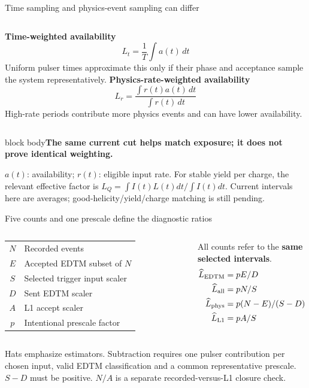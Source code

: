 \documentclass[aspectratio=169,11pt]{beamer}
\newcommand{\source}[1]{\par\vfill{\scriptsize\color{muted}#1\par}}
\newcommand{\takeaway}[1]{\begin{beamercolorbox}[sep=2.5mm,wd=\linewidth]{block body}\textbf{#1}\end{beamercolorbox}}
\newcommand{\Lp}{\widehat L_{\rm EDTM}}
\newcommand{\Lphys}{\widehat L_{\rm phys}}
\newcommand{\Lall}{\widehat L_{\rm all}}
\newcommand{\LLone}{\widehat L_{\rm L1}}
\begin{document}
\begin{frame}{Time sampling and physics-event sampling can differ}
\begin{columns}[T]
\textbf{Time-weighted availability}
\[L_{t}=\frac{1}{T}\int a(t)\,dt\]
Uniform pulser times approximate this only if their phase and acceptance sample the system representatively.
\textbf{Physics-rate-weighted availability}
\[L_r=\frac{\int r(t)a(t)\,dt}{\int r(t)\,dt}\]
High-rate periods contribute more physics events and can have lower availability.
\end{columns}
\vspace{4mm}
\takeaway{The same current cut helps match exposure; it does not prove identical weighting.}
\source{$a(t)$: availability; $r(t)$: eligible input rate. For stable yield per charge, the relevant effective factor is $L_Q=\int I(t)L(t)dt/\int I(t)dt$. Current intervals here are averages; good-helicity/yield/charge matching is still pending.}
\end{frame}

\begin{frame}{Five counts and one prescale define the diagnostic ratios}
\begin{columns}[T]
\small
\begin{tabular}{@{}cl@{}}\toprule
$N$ & Recorded events\\
$E$ & Accepted EDTM subset of $N$\\
$S$ & Selected trigger input scaler\\
$D$ & Sent EDTM scaler\\
$A$ & L1 accept scaler\\
$p$ & Intentional prescale factor\\\bottomrule
\end{tabular}
\vspace{4mm}\par All counts refer to the \textbf{same selected intervals}.
\begin{align*}
\Lp&=pE/D\\
\Lall&=pN/S\\
\Lphys&=p(N-E)/(S-D)\\
\LLone&=pA/S
\end{align*}
\end{columns}
\source{Hats emphasize estimators. Subtraction requires one pulser contribution per chosen input, valid EDTM classification and a common representative prescale. $S-D$ must be positive. $N/A$ is a separate recorded-versus-L1 closure check.}
\end{frame}
\end{document}
